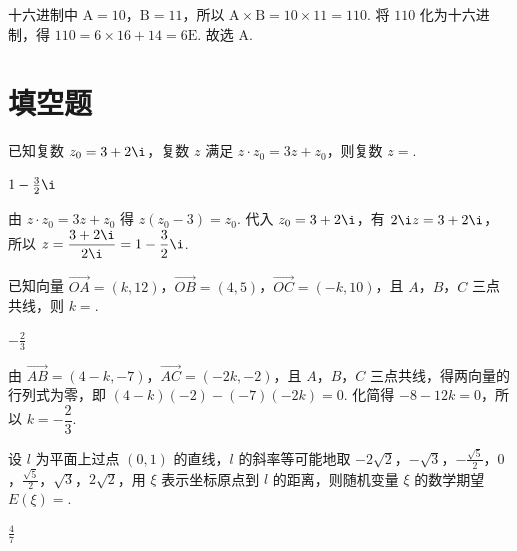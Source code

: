 \begin{solution}
十六进制中 \(\mathrm A=10\)，\(\mathrm B=11\)，所以 \(\mathrm A\times\mathrm B=10\times11=110\). 将 \(110\) 化为十六进制，得 \(110=6\times16+14=6\mathrm E\). 故选 A.
\end{solution}

\section{填空题}
\begin{problem}
已知复数 \(z_0 = 3 + 2\i\)，复数 \(z\) 满足 \(z \cdot z_0 = 3z + z_0\)，则复数 \(z = \)\fillinblank{}.
\end{problem}

\begin{answer}
\(1-\frac{3}{2}\i\)
\end{answer}

\begin{solution}
由 \(z\cdot z_0=3z+z_0\) 得 \(z(z_0-3)=z_0\). 代入 \(z_0=3+2\i\)，有 \(2\i z=3+2\i\)，所以 \(z=\dfrac{3+2\i}{2\i}=1-\dfrac{3}{2}\i\).
\end{solution}

\begin{problem}
已知向量 \( \overrightarrow{OA} = (k, 12) \)，\( \overrightarrow{OB} = (4, 5) \)，\( \overrightarrow{OC} = (-k, 10) \)，且 \(A\)，\(B\)，\(C\) 三点共线，则 \(k=\)\fillinblank{}.
\end{problem}

\begin{answer}
\(-\frac{2}{3}\)
\end{answer}

\begin{solution}
由 \(\overrightarrow{AB}=(4-k,-7)\)，\(\overrightarrow{AC}=(-2k,-2)\)，且 \(A\)，\(B\)，\(C\) 三点共线，得两向量的行列式为零，即 \((4-k)(-2)-(-7)(-2k)=0\). 化简得 \(-8-12k=0\)，所以 \(k=-\dfrac{2}{3}\).
\end{solution}

\begin{problem}
设 \(l\) 为平面上过点 \((0,1)\) 的直线，\(l\) 的斜率等可能地取
\(-2\sqrt{2}\)，\(-\sqrt{3}\)，\(-\frac{\sqrt{5}}{2}\)，\(0\)，\(\frac{\sqrt{5}}{2}\)，\(\sqrt{3}\)，\(2\sqrt{2}\)，用 \(\xi\) 表示坐标原点到 \(l\) 的距离，则随机变量 \(\xi\) 的数学期望 \(E(\xi) =\)\fillinblank{}.
\end{problem}

\begin{answer}
\(\frac{4}{7}\)
\end{answer}


